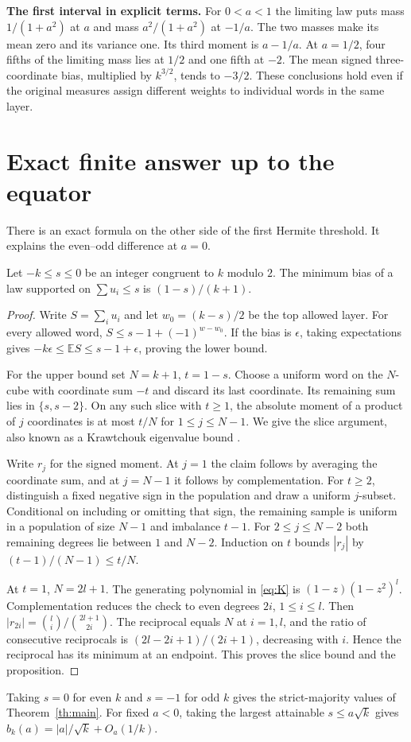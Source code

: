 \documentclass[11pt,letterpaper]{article}
\theoremstyle{research}
\newcommand{\E}{\mathbb E}\newcommand{\R}{\mathbb R}\newcommand{\N}{\mathbb N}
\newcommand{\sect}[1]{\section{\texorpdfstring{\color{ink}#1}{#1}}}
\begin{document}
\textbf{The first interval in explicit terms.}
For $0<a<1$ the limiting law puts mass $1/(1+a^2)$ at $a$ and mass
$a^2/(1+a^2)$ at $-1/a$. The two masses make its mean zero and its variance
one. Its third moment is $a-1/a$. At $a=1/2$, four fifths of the limiting
mass lies at $1/2$ and one fifth at $-2$. The mean signed three-coordinate
bias, multiplied by $k^{3/2}$, tends to $-3/2$. These conclusions hold
even if the original measures assign different weights to individual words
in the same layer.
\clearpage

\clearpage
\sect{Exact finite answer up to the equator}
There is an exact formula on the other side of the first Hermite threshold.
It explains the even--odd difference at $a=0$.
\begin{proposition}\label{prop:majority}
Let $-k\le s\le0$ be an integer congruent to $k$ modulo $2$. The minimum
bias of a law supported on $\sum u_i\le s$ is $(1-s)/(k+1)$.
\end{proposition}
\begin{proof}
Write $S=\sum_i u_i$ and let $w_0=(k-s)/2$ be the top allowed layer.
For every allowed word,
$S\le s-1+(-1)^{w-w_0}$. If the bias is $\epsilon$, taking expectations
gives $-k\epsilon\le\E S\le s-1+\epsilon$, proving the lower bound.

For the upper bound set $N=k+1$, $t=1-s$. Choose a uniform word on
the $N$-cube with coordinate sum $-t$ and discard its last coordinate.
Its remaining sum lies in $\{s,s-2\}$. On any such slice with
$t\ge1$, the absolute moment of a product of $j$ coordinates is at most
$t/N$ for $1\le j\le N-1$. We give the slice argument, also known as
a Krawtchouk eigenvalue bound \cite{kraw}.

Write $r_j$ for the signed moment. At $j=1$ the claim follows by averaging
the coordinate sum, and at $j=N-1$ it follows by complementation.
For $t\ge2$, distinguish a fixed negative sign in the population and draw
a uniform $j$-subset. Conditional on including or omitting that sign, the
remaining sample is uniform in a population of size $N-1$ and imbalance
$t-1$. For $2\le j\le N-2$ both remaining degrees lie between $1$ and $N-2$.
Induction on $t$ bounds $|r_j|$ by $(t-1)/(N-1)\le t/N$.

At $t=1$, $N=2l+1$. The generating polynomial in \eqref{eq:K} is
$(1-z)(1-z^2)^l$. Complementation reduces the check to even degrees
$2i$, $1\le i\le l$. Then
$|r_{2i}|=\binom{l}{i}/\binom{2l+1}{2i}$. The reciprocal equals $N$
at $i=1,l$, and the ratio of consecutive reciprocals is
$(2l-2i+1)/(2i+1)$, decreasing with $i$. Hence the reciprocal has its
minimum at an endpoint. This proves the slice bound and the proposition.
\end{proof}
Taking $s=0$ for even $k$ and $s=-1$ for odd $k$ gives the strict-majority
values of Theorem~\ref{th:main}. For fixed $a<0$, taking the largest attainable
$s\le a\sqrt k$ gives $b_k(a)=|a|/\sqrt k+O_a(1/k)$.
\end{document}
